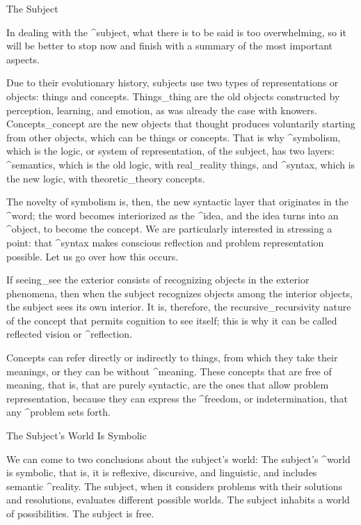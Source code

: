 \Section The Subject

In dealing with the ^{subject}, what there is to be said is too
overwhelming, so it will be better to stop now and finish with a summary
of the most important aspects.

Due to their evolutionary history, subjects use two types of
representations or objects: things and concepts. Things_{thing} are the
old objects constructed by perception, learning, and emotion, as was
already the case with knowers. Concepts_{concept} are the new objects
that thought produces voluntarily starting from other objects, which can
be things or concepts. That is why ^{symbolism}, which is the logic, or
system of representation, of the subject, has two layers: ^{semantics},
which is the old logic, with real_{reality} things, and ^{syntax}, which
is the new logic, with theoretic_{theory} concepts.

The novelty of symbolism is, then, the new syntactic layer that
originates in the ^{word}; the word becomes interiorized as the ^{idea},
and the idea turns into an ^{object}, to become the concept. We are
particularly interested in stressing a point: that ^{syntax} makes
conscious reflection and problem representation possible. Let us go over
how this occurs.


If seeing_{see} the exterior consists of recognizing objects in the
exterior phenomena, then when the subject recognizes objects among the
interior objects, the subject sees its own interior. It is, therefore,
the recursive_{recursivity} nature of the concept that permits cognition
to see itself; this is why it can be called reflected vision or
^{reflection}.

Concepts can refer directly or indirectly to things, from which they
take their meanings, or they can be without ^{meaning}. These concepts
that are free of meaning, that is, that are purely syntactic, are the
ones that allow problem representation, because they can express the
^{freedom}, or indetermination, that any ^{problem} sets forth.


\Section The Subject's World Is Symbolic

We can come to two conclusions about the subject's world:
\point The subject's ^{world} is symbolic, that is, it is reflexive,
discursive, and linguistic, and includes semantic ^{reality}.
\point The subject, when it considers problems with their solutions
and resolutions, evaluates different possible worlds. The subject
inhabits a world of possibilities. The subject is free.


\endinput
